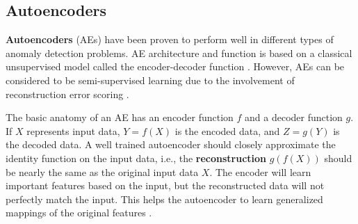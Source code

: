 \documentclass[sigconf]{acmart}
\begin{document}





\subsection{Autoencoders}

\textbf{Autoencoders} (AEs) have been proven to perform well in different types of anomaly detection problems. AE architecture and function is based on a classical unsupervised model called the encoder-decoder function
\cite{SAKURADA, AN, RANZATO}.  However, AEs can be considered to be semi-supervised learning due to the involvement of reconstruction error scoring \cite{AN}. 

The basic anatomy of an AE has an encoder function $f$ and a decoder function $g$. If $X$ represents input data, $Y = f(X)$ is the encoded data, and $Z = g(Y)$ is the decoded data. A well trained autoencoder should closely approximate the
identity function on the input data, i.e., the \textbf{reconstruction} $g(f(X))$ should be nearly the same as the original input data $X$.  The encoder will learn important features based on the input, but the reconstructed data will
not perfectly match the input. This helps the autoencoder to learn generalized mappings of the original features \cite{CHARTE,PEDREGOSA,KINGMA}. 
\end{document}
